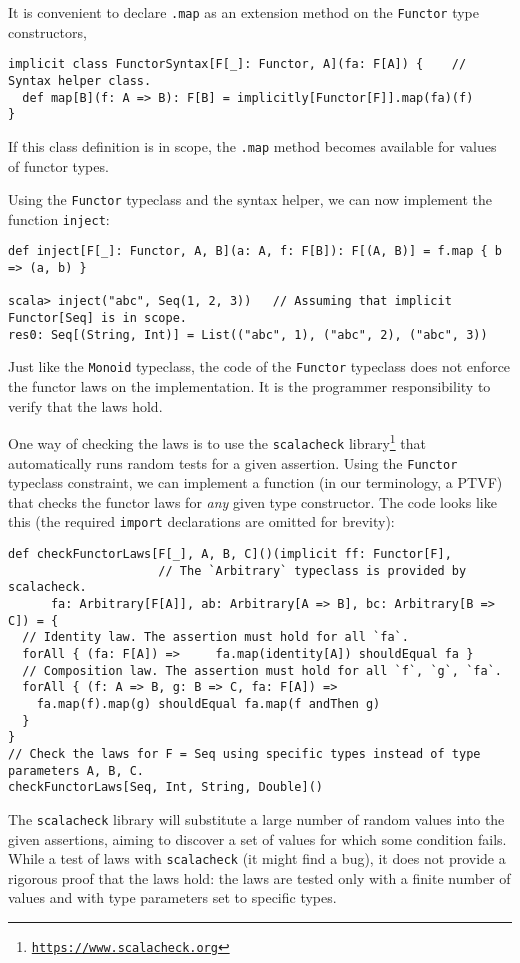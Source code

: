 It is convenient to declare \lstinline!.map! as an extension method
on the \lstinline!Functor! type constructors,
\begin{lstlisting}
implicit class FunctorSyntax[F[_]: Functor, A](fa: F[A]) {    // Syntax helper class.
  def map[B](f: A => B): F[B] = implicitly[Functor[F]].map(fa)(f)
}
\end{lstlisting}
If this class definition is in scope, the \lstinline!.map! method
becomes available for values of functor types.

Using the \lstinline!Functor! typeclass and the syntax helper, we
can now implement the function \lstinline!inject!:
\begin{lstlisting}
def inject[F[_]: Functor, A, B](a: A, f: F[B]): F[(A, B)] = f.map { b => (a, b) }

scala> inject("abc", Seq(1, 2, 3))   // Assuming that implicit Functor[Seq] is in scope.
res0: Seq[(String, Int)] = List(("abc", 1), ("abc", 2), ("abc", 3))
\end{lstlisting}
 Just like the \lstinline!Monoid! typeclass, the code of the \lstinline!Functor!
typeclass does not enforce the functor laws on the implementation.
It is the programmer responsibility to verify that the laws hold.

One way of checking the laws is to use the \texttt{scalacheck} library\footnote{\texttt{\href{https://www.scalacheck.org}{https://www.scalacheck.org}}}
that automatically runs random tests for a given assertion. Using
the \lstinline!Functor! typeclass constraint, we can implement a
function (in our terminology, a PTVF) that checks the functor laws
for \emph{any} given type constructor. The code looks like this (the
required \lstinline!import! declarations are omitted for brevity):
\begin{lstlisting}
def checkFunctorLaws[F[_], A, B, C]()(implicit ff: Functor[F],
                     // The `Arbitrary` typeclass is provided by scalacheck.
      fa: Arbitrary[F[A]], ab: Arbitrary[A => B], bc: Arbitrary[B => C]) = {
  // Identity law. The assertion must hold for all `fa`.
  forAll { (fa: F[A]) =>     fa.map(identity[A]) shouldEqual fa }
  // Composition law. The assertion must hold for all `f`, `g`, `fa`.
  forAll { (f: A => B, g: B => C, fa: F[A]) =>
    fa.map(f).map(g) shouldEqual fa.map(f andThen g)
  }
}
// Check the laws for F = Seq using specific types instead of type parameters A, B, C.
checkFunctorLaws[Seq, Int, String, Double]()
\end{lstlisting}

The \texttt{scalacheck} library will substitute a large number of
random values into the given assertions, aiming to discover a set
of values for which some condition fails. While a test of laws with
\texttt{scalacheck} (it might find a bug), it does not provide a rigorous
proof that the laws hold: the laws are tested only with a finite number
of values and with type parameters set to specific types.

